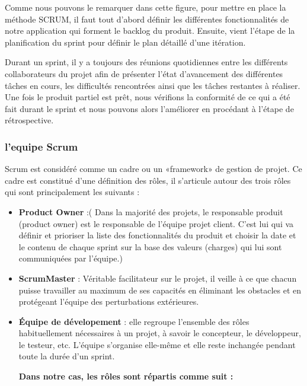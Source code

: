 \medskip

Comme nous pouvons le remarquer dans cette figure, pour mettre en place la méthode SCRUM, il faut tout d'abord définir les différentes fonctionnalités de notre application qui forment le backlog du produit. Ensuite, vient l'étape de la planification du sprint pour définir le plan détaillé d'une itération.

\medskip

Durant un sprint, il y a toujours des réunions quotidiennes entre les différents collaborateurs du projet afin de présenter l'état d'avancement des différentes tâches en cours, les difficultés rencontrées ainsi que les tâches restantes à réaliser. Une fois le produit partiel est prêt, nous vérifions la conformité de ce qui a été fait durant le sprint et nous pouvons alors l'améliorer en procédant à l'étape de rétrospective.

\medskip
\subsubsection{l'equipe Scrum}
Scrum est considéré comme un cadre ou un «framework» de gestion de projet. Ce cadre est
constitué d’une définition des rôles, il s’articule autour des trois rôles qui sont principalement les suivants :

\medskip

\begin{itemize}
  \item \textbf{Product Owner} :\small ( Dans la majorité des projets, le responsable produit (product owner) est le responsable de l'équipe projet client. C'est lui qui va définir et prioriser la liste des fonctionnalités du produit et choisir la date et le contenu de chaque sprint sur la base des valeurs (charges) qui lui sont communiquées par l'équipe.)
  \smallskip
  \item \textbf{ScrumMaster} : Véritable facilitateur sur le projet, il veille à ce que chacun puisse travailler au maximum de ses capacités en éliminant les obstacles et en protégeant l'équipe des perturbations extérieures.
  \smallskip
  \item \textbf{Équipe de dévelopement} : elle regroupe l’ensemble des rôles habituellement nécessaires à un projet, à savoir le concepteur, le développeur, le testeur, etc. L'équipe s'organise elle-même et elle reste inchangée pendant toute la durée d'un sprint.

\textbf{Dans notre cas, les rôles sont répartis comme suit :}

\end{itemize}

